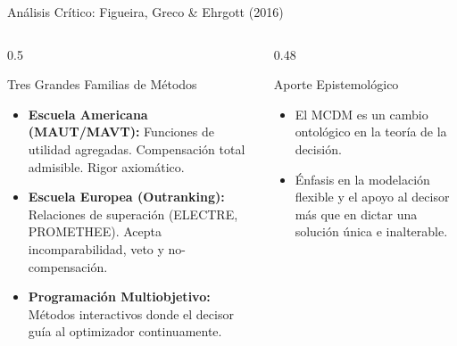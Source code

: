 \documentclass[aspectratio=169, 10pt]{beamer}
\begin{document}
\begin{frame}{Análisis Crítico: Figueira, Greco \& Ehrgott (2016)}
    \begin{columns}[T]
        \begin{column}{0.5\textwidth}
            \begin{block}{Tres Grandes Familias de Métodos}
                \begin{itemize}
                    \item \textbf{Escuela Americana (MAUT/MAVT):} Funciones de utilidad agregadas. Compensación total admisible. Rigor axiomático.
                    \item \textbf{Escuela Europea (Outranking):} Relaciones de superación (ELECTRE, PROMETHEE). Acepta incomparabilidad, veto y no-compensación.
                    \item \textbf{Programación Multiobjetivo:} Métodos interactivos donde el decisor guía al optimizador continuamente.
                \end{itemize}
            \end{block}
        \end{column}
        
        \begin{column}{0.48\textwidth}
            \begin{exampleblock}{Aporte Epistemológico}
                \begin{itemize}
                    \item El MCDM es un cambio ontológico en la teoría de la decisión.
                    \item Énfasis en la modelación flexible y el apoyo al decisor más que en dictar una solución única e inalterable.
                \end{itemize}
            \end{exampleblock}
        \end{column}
    \end{columns}
\end{frame}
\end{document}
